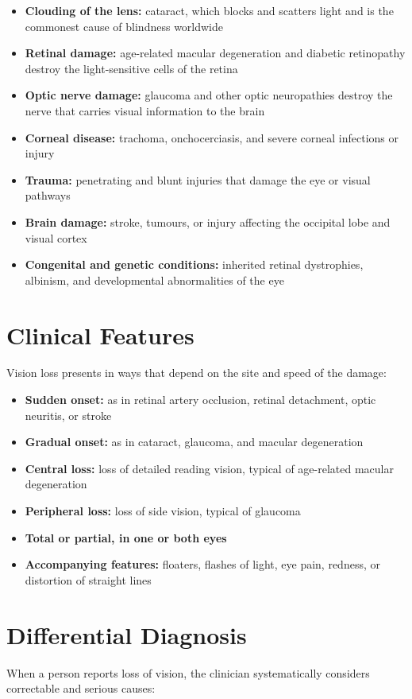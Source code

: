 \begin{itemize}
    \item \textbf{Clouding of the lens:} cataract, which blocks and scatters light and is the commonest cause of blindness worldwide
    \item \textbf{Retinal damage:} age-related macular degeneration and diabetic retinopathy destroy the light-sensitive cells of the retina
    \item \textbf{Optic nerve damage:} glaucoma and other optic neuropathies destroy the nerve that carries visual information to the brain
    \item \textbf{Corneal disease:} trachoma, onchocerciasis, and severe corneal infections or injury
    \item \textbf{Trauma:} penetrating and blunt injuries that damage the eye or visual pathways
    \item \textbf{Brain damage:} stroke, tumours, or injury affecting the occipital lobe and visual cortex
    \item \textbf{Congenital and genetic conditions:} inherited retinal dystrophies, albinism, and developmental abnormalities of the eye
\end{itemize}

\section*{Clinical Features}
Vision loss presents in ways that depend on the site and speed of the damage:

\begin{itemize}
    \item \textbf{Sudden onset:} as in retinal artery occlusion, retinal detachment, optic neuritis, or stroke
    \item \textbf{Gradual onset:} as in cataract, glaucoma, and macular degeneration
    \item \textbf{Central loss:} loss of detailed reading vision, typical of age-related macular degeneration
    \item \textbf{Peripheral loss:} loss of side vision, typical of glaucoma
    \item \textbf{Total or partial, in one or both eyes}
    \item \textbf{Accompanying features:} floaters, flashes of light, eye pain, redness, or distortion of straight lines
\end{itemize}

\section*{Differential Diagnosis}
When a person reports loss of vision, the clinician systematically considers correctable and serious causes:

